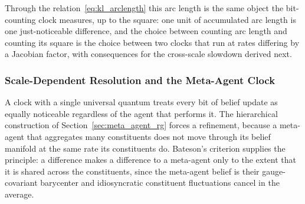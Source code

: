 Through the relation~\eqref{eq:kl_arclength} this arc length is the same object the bit-counting clock measures, up to the square: one unit of accumulated arc length is one just-noticeable difference, and the choice between counting arc length and counting its square is the choice between two clocks that run at rates differing by a Jacobian factor, with consequences for the cross-scale slowdown derived next.



\subsubsection{Scale-Dependent Resolution and the Meta-Agent Clock}
\label{sec:scale_dependent_time}

A clock with a single universal quantum treats every bit of belief update as equally noticeable regardless of the agent that performs it. The hierarchical construction of Section~\ref{sec:meta_agent_rg} forces a refinement, because a meta-agent that aggregates many constituents does not move through its belief manifold at the same rate its constituents do. Bateson's criterion supplies the principle: a difference makes a difference to a meta-agent only to the extent that it is shared across the constituents, since the meta-agent belief is their gauge-covariant barycenter and idiosyncratic constituent fluctuations cancel in the average.

